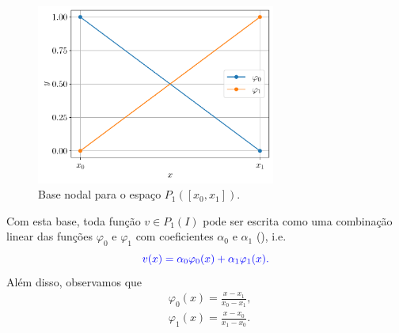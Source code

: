 \begin{figure}[H]
  \centering
  \includegraphics[width=0.7\textwidth]{./cap_mef1d/dados/fig_p1_0/fig}
  \caption{Base nodal para o espaço $P_1([x_0, x_1])$.}
  \label{fig:p1_0}
\end{figure}

Com esta base, toda função $v\in P_1(I)$ pode ser escrita como uma combinação linear das funções $\varphi_0$ e $\varphi_1$ com coeficientes $\alpha_0$ e $\alpha_1$ (), i.e.
\begin{equation}\color{blue}v(x) = \alpha_0\varphi_0(x) + \alpha_1\varphi_1(x).
\end{equation}
Além disso, observamos que
\begin{align}
  &\varphi_0(x) = \frac{x-x_1}{x_0-x_1},\\
  &\varphi_1(x) = \frac{x-x_0}{x_1-x_0}.
\end{align}




